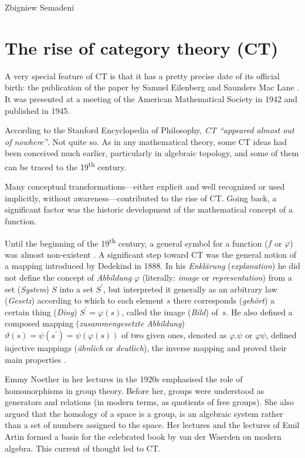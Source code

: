 \begin{artengenv}{Zbigniew Semadeni}
\section{The rise of category theory (CT)}
A very special feature of CT is that it has a pretty precise date of its official 
birth: the publication of the paper by Samuel Eilenberg and Saunders Mac Lane 
\parencite*{E-ML}. It was presented at a meeting of the American Mathematical Society in 
1942 and published in 1945.

According to the Stanford Encyclopedia of Philosophy, \textit{CT ``appeared almost out 
of nowhere''}. Not quite so. As in any mathematical theory, some CT ideas had been 
conceived much earlier, particularly in algebraic topology, and some of them can 
be traced to the 19\textsuperscript{th} century. 

Many conceptual transformations---either explicit and well recognized or 
used implicitly, without awareness---contributed to the rise of CT. Going back,  
a significant factor was the historic development of the mathematical concept of 
a function. 

Until the beginning of the 19\textsuperscript{th} century, a general symbol for a function ($f$ or 
$\varphi$) was almost non-existent \parencite{Youschkevitsch}. 
A significant step toward CT was the general notion of a mapping introduced by 
Dedekind in 1888. In his \textit{Enkl{\"a}rung} (\textit{explanation}) 
he did not define the concept of \textit{Abbildung} $\varphi$ (literally: 
\textit{image} or \textit{representation}) from a set (\textit{System}) $S$ into a set 
$S^\prime$, but interpreted it generally as an arbitrary law (\textit{Gesetz}) according 
to which to each element $s$ there corresponds (\textit{geh{\"o}rt}) a certain 
thing (\textit{Ding}) $S^\prime = \varphi(s)$, called the image (\textit{Bild}) 
of~$s$. He also defined a composed mapping (\textit{zusammengesetzte Abbildung}) 
$\vartheta(s) = \psi(s^\prime) = \psi(\varphi(s))$ of two given ones, denoted 
as $\varphi.\psi$ or $\varphi\psi$, defined injective mappings (\textit{{\"a}hnlich} 
or \textit{deutlich}), the inverse mapping and proved their main properties 
\parencites[][\S2--4]{Was_sind}[][p.88--90, 228--229]{Ferreiros}.

Emmy Noether in her lectures in the 1920s emphasised the role of homomorphisms 
in group theory. Before her, groups were understood as generators and relations 
(in modern terms, as quotients of free groups). She also argued that the homology 
of a space is a group, is an algebraic system rather than a set of numbers assigned 
to the space. Her lectures and the lectures of Emil Artin formed a basis for the 
celebrated book by van der Waerden \parencite*{Waerden} on modern algebra. This current 
of thought led to CT.


\end{artengenv}
